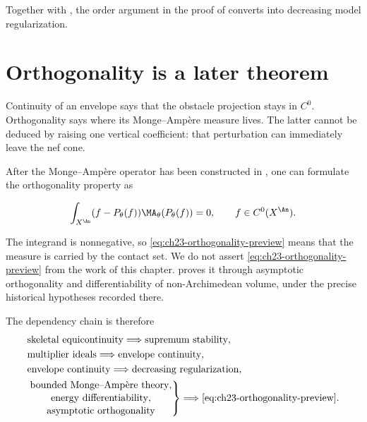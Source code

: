 Together with , the order
argument in the proof of
 converts
 into decreasing model regularization.

\section{Orthogonality is a later theorem}

Continuity of an envelope says that the obstacle projection stays in
$C^0$.  Orthogonality says where its Monge--Amp\`ere measure lives.  The
latter cannot be deduced by raising one vertical coefficient: that
perturbation can immediately leave the nef cone.

After the Monge--Amp\`ere operator has been constructed in
, one can formulate the orthogonality property as

\begin{equation}\label{eq:ch23-orthogonality-preview}
 \int_{X^{\An}}
       (f-P_\theta(f))
       \MA_\theta(P_\theta(f))=0,
 \qquad f\in C^0(X^{\An}).
\end{equation}

The integrand is nonnegative, so \eqref{eq:ch23-orthogonality-preview}
means that the measure is carried by the contact set.  We do not assert
\eqref{eq:ch23-orthogonality-preview} from the work of this chapter.
 proves it through asymptotic
orthogonality and differentiability of non-Archimedean volume, under the
precise historical hypotheses recorded there.

The dependency chain is therefore
\begin{equation}\label{eq:ch23-dependency-chain}
 \begin{aligned}
  &\text{skeletal equicontinuity}
    \Longrightarrow \text{supremum stability},\\
  &\text{multiplier ideals}
    \Longrightarrow \text{envelope continuity},\\
  &\text{envelope continuity}
    \Longrightarrow \text{decreasing regularization},\\
  &\left.
    \begin{gathered}
      \text{bounded Monge--Amp\`ere theory},\\[-2pt]
      \text{energy differentiability},\\[-2pt]
      \text{asymptotic orthogonality}
    \end{gathered}
    \right\}
    \Longrightarrow \eqref{eq:ch23-orthogonality-preview}.
 \end{aligned}
\end{equation}

